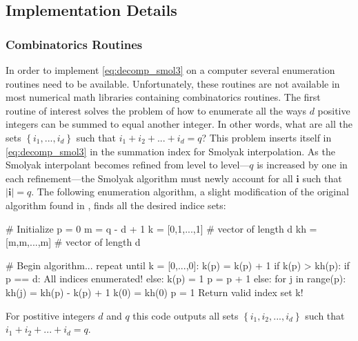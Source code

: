 \subsection{Implementation Details} \label{subsec:implement_details}

\subsubsection{Combinatorics Routines} \label{subsubsec:combinatorics_routines}

In order to implement \ref{eq:decomp_smol3} on a computer several enumeration routines need to be available. Unfortunately, these routines are not available in most numerical math libraries containing combinatorics routines. The first routine of interest solves the problem of how to enumerate all the ways $d$ positive integers can be summed to equal another integer. In other words, what are all the sets $\left\{i_1,...,i_d\right\}$ such that $i_1 + i_2 + ... + i_d = q$? This problem inserts itself in \ref{eq:decomp_smol3} in the summation index for Smolyak interpolation. As the Smolyak interpolant becomes refined from level to level---$q$ is increased by one in each refinement---the Smolyak algorithm must newly account for all $\textbf{i}$ such that $\vert\textbf{i}\vert=q$. The following enumeration algorithm, a slight modification of the original algorithm found in \cite{Holtz}, finds all the desired indice sets:        
\begin{program} 
\begin{code}
# Initialize
p = 0
m = q - d + 1 
k = [0,1,...,1]   # vector of length d
kh = [m,m,...,m]  # vector of length d

# Begin algorithm...
repeat until k = [0,...,0]:
   k(p) = k(p) + 1
   if k(p) > kh(p):
      if p == d:
         All indices enumerated!
      else:
         k(p) = 1
         p = p + 1
   else:
      for j in range(p):
         kh(j) = kh(p) - k(p) + 1
      k(0) = kh(0)
      p = 1
      Return valid index set k!
\end{code}
\caption{\label{code:enumeration1} 
For postitive integers $d$ and $q$ this code outputs all sets $\left\{i_1,i_2,...,i_d\right\}$ such that $i_1+i_2+...+i_d=q$.}  
\end{program}


